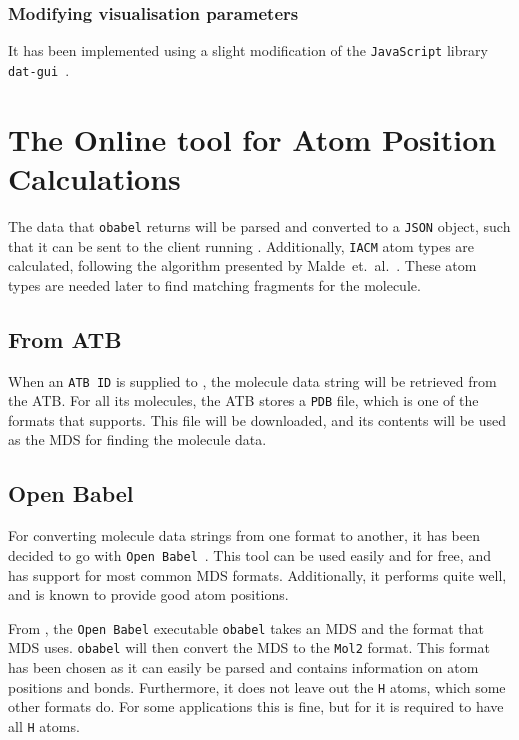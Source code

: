 \subsubsection{Modifying visualisation parameters}
It has been implemented using a slight modification of the \verb|JavaScript| library \verb|dat-gui|~\cite{data2011dat}.

%

\section[\oapoc]{The Online tool for Atom Position Calculations}
The data that \verb|obabel| returns will be parsed and converted to a \verb|JSON| object, such that it can be sent to the client running \oframp. Additionally, \verb|IACM| atom types are calculated, following the algorithm presented by Malde~et.~al.~\cite{malde2011automated}. These atom types are needed later to find matching fragments for the molecule.

\subsection{From ATB}
When an \verb|ATB ID| is supplied to \oapoc, the molecule data string will be retrieved from the ATB. For all its molecules, the ATB stores a \verb|PDB| file, which is one of the formats that \oapoc{} supports. This file will be downloaded, and its contents will be used as the MDS for finding the molecule data.

\subsection{Open Babel}
For converting molecule data strings from one format to another, it has been decided to go with \verb|Open Babel|~\cite{oboyle2011open}. This tool can be used easily and for free, and has support for most common MDS formats. Additionally, it performs quite well, and is known to provide good atom positions.

From \oapoc, the \verb|Open Babel| executable \verb|obabel| takes an MDS and the format that MDS uses. \verb|obabel| will then convert the MDS to the \verb|Mol2| format. This format has been chosen as it can easily be parsed and contains information on atom positions and bonds. Furthermore, it does not leave out the \verb|H| atoms, which some other formats do. For some applications this is fine, but for \oframp{} it is required to have all \verb|H| atoms.

